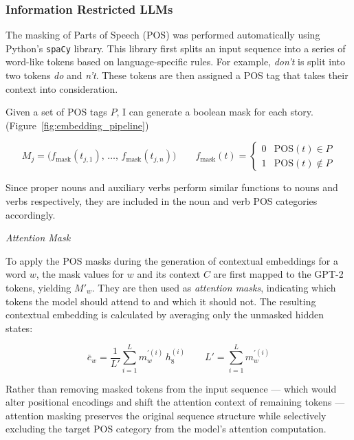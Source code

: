 \documentclass[a4paper]{article}
\begin{document}
\subsubsection*{Information Restricted LLMs}
The masking of Parts of Speech (POS) was performed automatically using Python's \texttt{spaCy} library. This library first splits an input sequence into a series of word-like tokens based on language-specific rules. For example, \textit{don't} is split into two tokens \textit{do} and \textit{n't}. These tokens are then assigned a POS tag that takes their context into consideration.
 
Given a set of POS tags $P$, I can generate a boolean mask for each story. (Figure~\ref{fig:embedding_pipeline})
 
\begin{equation*}
    M_j = \bigl(f_{\text{mask}}(t_{j,1}),\, \ldots,\, f_{\text{mask}}(t_{j,n})\bigr)
    \qquad
    f_{\text{mask}}(t) =
    \begin{cases}
        0 & \text{POS}(t) \in P \\
        1 & \text{POS}(t) \notin P
    \end{cases}
\end{equation*}
 
Since proper nouns and auxiliary verbs perform similar functions to nouns and verbs respectively, they are included in the noun and verb POS categories accordingly.
 
\textit{Attention Mask}
 
To apply the POS masks during the generation of contextual embeddings for a word $w$, the mask values for $w$ and its context $C$ are first mapped to the GPT-2 tokens, yielding $M'_w$. They are then used as \textit{attention masks}, indicating which tokens the model should attend to and which it should not. The resulting contextual embedding is calculated by averaging only the unmasked hidden states:

\begin{equation*}
    \bar{e}_w = \frac{1}{L'} \sum_{i=1}^{L} m_w^{\prime(i)}\, h_8^{(i)}
    \qquad
    L' = \sum_{i=1}^{L} m_w^{\prime(i)}
\end{equation*}

Rather than removing masked tokens from the input sequence --- which would alter positional encodings and shift the attention context of remaining tokens --- attention masking preserves the original sequence structure while selectively excluding the target POS category from the model's attention computation.
\end{document}
